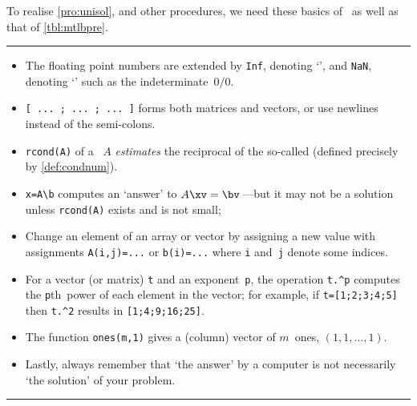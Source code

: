 \begin{table}
\caption{To realise \autoref{pro:unisol}, and other procedures, we need these basics of \script\ as well as that of \autoref{tbl:mtlbpre}.} \label{tbl:mtlbbasics}
\hrule
\begin{minipage}{\linewidth}
\begin{itemize}
\item The floating point numbers are extended by \verb|Inf|, denoting `', and \verb|NaN|, denoting `' such as the indeterminate~\(0/0\).
\item {}\verb|[ ... ; ... ; ... ]| forms both matrices and vectors, or use newlines instead of the semi-colons.
\item {}\verb|rcond(A)|  of a ~\(A\) \emph{estimates} the reciprocal of the so-called  (defined precisely by \autoref{def:condnum}).
\item {}\verb|x=A\b| computes an `answer' to \(A\xv=\bv\)\,---but it may not be a solution unless \verb|rcond(A)| exists and is not small;
\item {}Change an element of an array or vector by assigning a new value with assignments \verb|A(i,j)=...| or \verb|b(i)=...| where \verb|i| and~\verb|j| denote some indices.
\item {}For a vector (or matrix) \verb|t| and an exponent~\verb|p|, the operation \verb|t.^p| computes the \verb|p|th~power of each element in the vector; for example, if \verb|t=[1;2;3;4;5]| then \verb|t.^2| results in \verb|[1;4;9;16;25]|.
\item The function \verb|ones(m,1)| gives a (column) vector of \(m\)~ones, \((1,1,\ldots,1)\).
\item Lastly, always remember that `the answer' by a computer is not necessarily `the solution' of your problem.
\end{itemize}
\end{minipage}
\hrule
\end{table}

